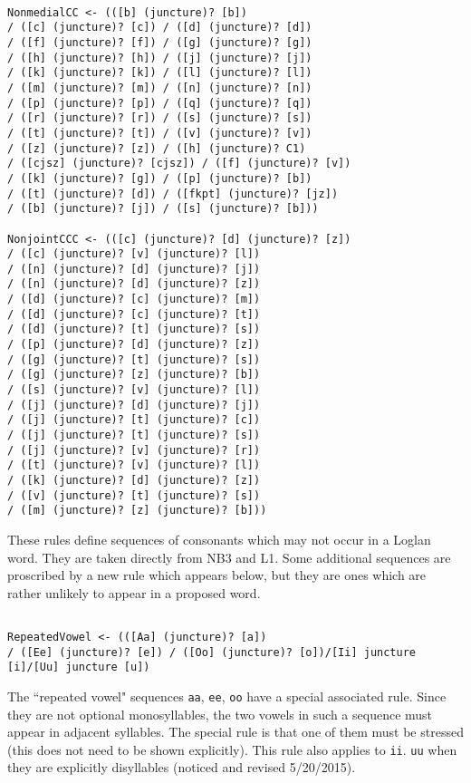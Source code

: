 \documentclass[12pt]{article}
\begin{document}
\begin{verbatim}

NonmedialCC <- (([b] (juncture)? [b]) 
/ ([c] (juncture)? [c]) / ([d] (juncture)? [d]) 
/ ([f] (juncture)? [f]) / ([g] (juncture)? [g]) 
/ ([h] (juncture)? [h]) / ([j] (juncture)? [j]) 
/ ([k] (juncture)? [k]) / ([l] (juncture)? [l]) 
/ ([m] (juncture)? [m]) / ([n] (juncture)? [n]) 
/ ([p] (juncture)? [p]) / ([q] (juncture)? [q]) 
/ ([r] (juncture)? [r]) / ([s] (juncture)? [s]) 
/ ([t] (juncture)? [t]) / ([v] (juncture)? [v]) 
/ ([z] (juncture)? [z]) / ([h] (juncture)? C1) 
/ ([cjsz] (juncture)? [cjsz]) / ([f] (juncture)? [v]) 
/ ([k] (juncture)? [g]) / ([p] (juncture)? [b]) 
/ ([t] (juncture)? [d]) / ([fkpt] (juncture)? [jz]) 
/ ([b] (juncture)? [j]) / ([s] (juncture)? [b]))

NonjointCCC <- (([c] (juncture)? [d] (juncture)? [z]) 
/ ([c] (juncture)? [v] (juncture)? [l]) 
/ ([n] (juncture)? [d] (juncture)? [j]) 
/ ([n] (juncture)? [d] (juncture)? [z]) 
/ ([d] (juncture)? [c] (juncture)? [m]) 
/ ([d] (juncture)? [c] (juncture)? [t]) 
/ ([d] (juncture)? [t] (juncture)? [s]) 
/ ([p] (juncture)? [d] (juncture)? [z]) 
/ ([g] (juncture)? [t] (juncture)? [s]) 
/ ([g] (juncture)? [z] (juncture)? [b]) 
/ ([s] (juncture)? [v] (juncture)? [l]) 
/ ([j] (juncture)? [d] (juncture)? [j]) 
/ ([j] (juncture)? [t] (juncture)? [c]) 
/ ([j] (juncture)? [t] (juncture)? [s]) 
/ ([j] (juncture)? [v] (juncture)? [r]) 
/ ([t] (juncture)? [v] (juncture)? [l]) 
/ ([k] (juncture)? [d] (juncture)? [z]) 
/ ([v] (juncture)? [t] (juncture)? [s]) 
/ ([m] (juncture)? [z] (juncture)? [b]))

\end{verbatim}

These rules define sequences of consonants which may not occur in a Loglan word.  They are taken directly from NB3 and L1.  Some additional sequences are proscribed by a new rule which appears below, but they are ones which are rather unlikely to appear in a proposed word.

\begin{verbatim}

RepeatedVowel <- (([Aa] (juncture)? [a]) 
/ ([Ee] (juncture)? [e]) / ([Oo] (juncture)? [o])/[Ii] juncture [i]/[Uu] juncture [u])

\end{verbatim}

The ``repeated vowel" sequences {\tt aa}, {\tt ee}, {\tt oo} have a special associated rule.  Since they are not optional monosyllables, the two vowels in such a sequence must appear in adjacent syllables.  The special rule is that one of them must be stressed (this does not need to be shown explicitly).   This rule also applies to {\tt ii}. {\tt uu} when they are explicitly
disyllables (noticed and revised 5/20/2015).
\end{document}
